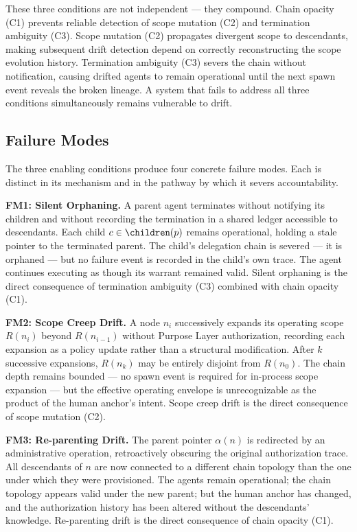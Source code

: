 \bigskip
These three conditions are not independent — they compound. Chain opacity (C1) prevents reliable detection of scope mutation (C2) and termination ambiguity (C3). Scope mutation (C2) propagates divergent scope to descendants, making subsequent drift detection depend on correctly reconstructing the scope evolution history. Termination ambiguity (C3) severs the chain without notification, causing drifted agents to remain operational until the next spawn event reveals the broken lineage. A system that fails to address all three conditions simultaneously remains vulnerable to drift.

\subsection{Failure Modes}
\label{sec:rs-drift-failure-modes}

The three enabling conditions produce four concrete failure modes. Each is distinct in its mechanism and in the pathway by which it severs accountability.

\bigskip
\noindent\textbf{FM1: Silent Orphaning.} A parent agent terminates without notifying its children and without recording the termination in a shared ledger accessible to descendants. Each child $c \in \children(p)$ remains operational, holding a stale pointer to the terminated parent. The child's delegation chain is severed — it is orphaned — but no failure event is recorded in the child's own trace. The agent continues executing as though its warrant remained valid. Silent orphaning is the direct consequence of termination ambiguity (C3) combined with chain opacity (C1).

\bigskip
\noindent\textbf{FM2: Scope Creep Drift.} A node $n_i$ successively expands its operating scope $R(n_i)$ beyond $R(n_{i-1})$ without Purpose Layer authorization, recording each expansion as a policy update rather than a structural modification. After $k$ successive expansions, $R(n_k)$ may be entirely disjoint from $R(n_0)$. The chain depth remains bounded — no spawn event is required for in-process scope expansion — but the effective operating envelope is unrecognizable as the product of the human anchor's intent. Scope creep drift is the direct consequence of scope mutation (C2).

\bigskip
\noindent\textbf{FM3: Re-parenting Drift.} The parent pointer $\alpha(n)$ is redirected by an administrative operation, retroactively obscuring the original authorization trace. All descendants of $n$ are now connected to a different chain topology than the one under which they were provisioned. The agents remain operational; the chain topology appears valid under the new parent; but the human anchor has changed, and the authorization history has been altered without the descendants' knowledge. Re-parenting drift is the direct consequence of chain opacity (C1).

